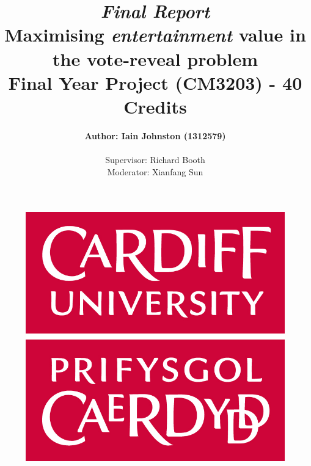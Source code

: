 \documentclass[12pt]{report}
\title{\textit{Final Report}\\\textbf{Maximising \textit{entertainment} value in the vote-reveal problem}\\ Final Year Project (CM3203) - 40 Credits}
\author{\textbf{Author: Iain Johnston (1312579)} \\ \\ Supervisor: Richard Booth\\ Moderator: Xianfang Sun}
\date{} %
\begin{document}
\begin{figure}[H]
\maketitle
\centering
\includegraphics[]{./CUlogo}
\end{figure}

\clearpage
\end{document}

